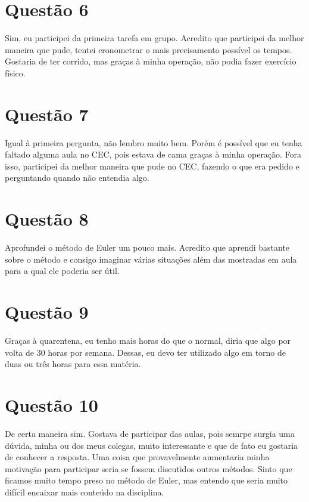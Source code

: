 \documentclass[11pt]{article}
\begin{document}
\section{Questão 6}
\label{sec:orga17ad45}
Sim, eu participei da primeira tarefa em grupo. Acredito que participei da
melhor maneira que pude, tentei cronometrar o mais precisamento possível
os tempos. Gostaria de ter corrido, mas graças à minha operação, não podia
fazer exercício físico.

\section{Questão 7}
\label{sec:org9a2c211}
Igual à primeira pergunta, não lembro muito bem. Porém é possível que eu
tenha faltado alguma aula no CEC, pois estava de cama graças à minha
operação. Fora isso, participei da melhor maneira que pude no CEC,
fazendo o que era pedido e perguntando quando não entendia algo.

\section{Questão 8}
\label{sec:org497f596}
Aprofundei o método de Euler um pouco mais. Acredito que aprendi bastante
sobre o método e consigo imaginar várias situações além das mostradas em aula
para a qual ele poderia ser útil.

\section{Questão 9}
\label{sec:org47fce4d}
Graças à quarentena, eu tenho mais horas do que o normal, diria que algo
por volta de 30 horas por semana. Dessas, eu devo ter utilizado algo em
torno de duas ou três horas para essa matéria.

\section{Questão 10}
\label{sec:org205fec0}
De certa maneira sim. Gostava de participar das aulas, pois semrpe surgia
uma dúvida, minha ou dos meus colegas, muito interessante e que de fato eu
gostaria de conhecer a resposta. Uma coisa que provavelmente aumentaria
minha motivação para participar seria se fossem discutidos outros métodos.
Sinto que ficamos muito tempo preso no método de Euler, mas entendo que 
seria muito difícil encaixar mais conteúdo na disciplina.
\end{document}
